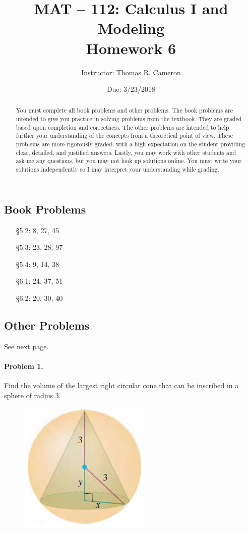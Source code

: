 \documentclass{article}
\title{MAT -- 112: Calculus I and Modeling\\
\large{Homework 6}}
\author{Instructor: Thomas R. Cameron}
\date{Due: 3/23/2018}
\begin{document}
\maketitle

\begin{abstract}
You must complete all book problems and other problems. The book problems are intended to give you practice in solving problems from the textbook. They are graded based upon completion and correctness. The other problems are intended to help further your understanding of the concepts from a theoretical point of view. These problems are more rigorously graded, with a high expectation on the student providing clear, detailed, and justified answers. Lastly, you may work with other students and ask me any questions, but you may not look up solutions online. You must write your solutions independently so I may interpret your understanding while grading. 
\end{abstract}

\subsection*{Book Problems}
\begin{itemize}
\item   [\S 5.2:] 8, 27, 45
\item   [\S 5.3:] 23, 28, 97
\item   [\S 5.4:] 9, 14, 38
\item   [\S 6.1:] 24, 37, 51
\item	  [\S 6.2:] 20, 30, 40
\end{itemize}

\subsection*{Other Problems}

See next page.

\newpage

\paragraph*{Problem 1.} Find the volume of the largest right circular cone that can be inscribed in a sphere of radius $3$. 
\begin{figure}[h!]
\centering
\includegraphics{Homework6_fig1}
\end{figure}
\end{document}
